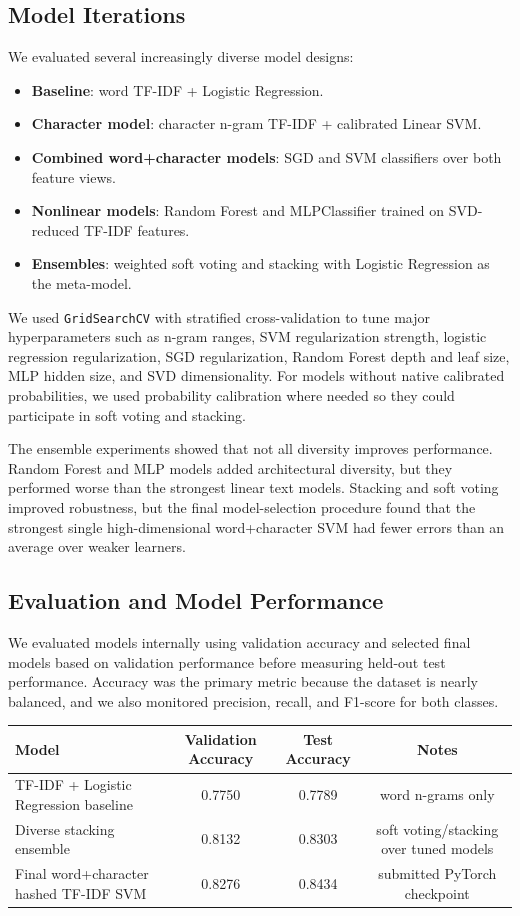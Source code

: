 \documentclass[10pt]{article}
\begin{document}
\subsection{Model Iterations}
We evaluated several increasingly diverse model designs:
\begin{itemize}
    \item \textbf{Baseline}: word TF-IDF + Logistic Regression.
    \item \textbf{Character model}: character n-gram TF-IDF + calibrated Linear SVM.
    \item \textbf{Combined word+character models}: SGD and SVM classifiers over both feature views.
    \item \textbf{Nonlinear models}: Random Forest and MLPClassifier trained on SVD-reduced TF-IDF features.
    \item \textbf{Ensembles}: weighted soft voting and stacking with Logistic Regression as the meta-model.
\end{itemize}

We used \texttt{GridSearchCV} with stratified cross-validation to tune major hyperparameters such as n-gram ranges, SVM regularization strength, logistic regression regularization, SGD regularization, Random Forest depth and leaf size, MLP hidden size, and SVD dimensionality. For models without native calibrated probabilities, we used probability calibration where needed so they could participate in soft voting and stacking.

The ensemble experiments showed that not all diversity improves performance. Random Forest and MLP models added architectural diversity, but they performed worse than the strongest linear text models. Stacking and soft voting improved robustness, but the final model-selection procedure found that the strongest single high-dimensional word+character SVM had fewer errors than an average over weaker learners.

\subsection{Evaluation and Model Performance}
We evaluated models internally using validation accuracy and selected final models based on validation performance before measuring held-out test performance. Accuracy was the primary metric because the dataset is nearly balanced, and we also monitored precision, recall, and F1-score for both classes.

\begin{center}
\begin{tabular}{lccc}
\hline
\textbf{Model} & \textbf{Validation Accuracy} & \textbf{Test Accuracy} & \textbf{Notes} \\
\hline
TF-IDF + Logistic Regression baseline & 0.7750 & 0.7789 & word n-grams only \\
Diverse stacking ensemble & 0.8132 & 0.8303 & soft voting/stacking over tuned models \\
Final word+character hashed TF-IDF SVM & 0.8276 & 0.8434 & submitted PyTorch checkpoint \\
\hline
\end{tabular}
\end{center}
\end{document}
